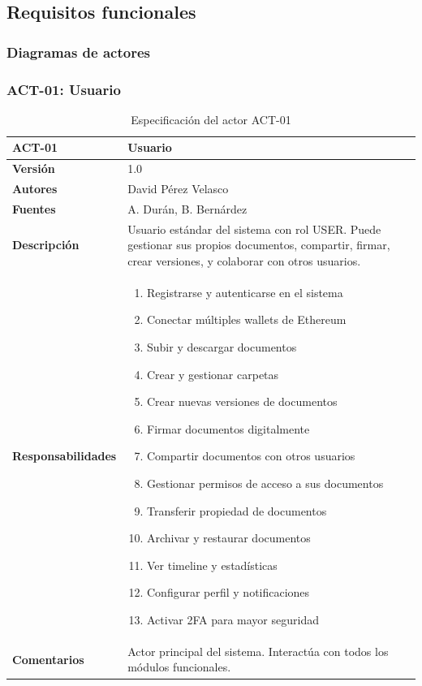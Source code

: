\documentclass[11pt, a4paper]{article}
\begin{document}
\subsection{Requisitos funcionales}

\subsubsection{Diagramas de actores}

\subsubsection{ACT-01: Usuario}

\begin{table}[H]
    \centering
    \small
    \begin{tabular}{|p{4cm}|p{10cm}|}
    \hline
    \textbf{ACT-01} & Usuario \\
    \hline
    \textbf{Versión} & 1.0 \\
    \hline
    \textbf{Autores} & David Pérez Velasco \\
    \hline
    \textbf{Fuentes} & A. Durán, B. Bernárdez \\
    \hline
    \textbf{Descripción} & Usuario estándar del sistema con rol USER. Puede gestionar sus propios documentos, compartir, firmar, crear versiones, y colaborar con otros usuarios. \\
    \hline
    \textbf{Responsabilidades} & 
    \begin{enumerate}
        \item Registrarse y autenticarse en el sistema
        \item Conectar múltiples wallets de Ethereum
        \item Subir y descargar documentos
        \item Crear y gestionar carpetas
        \item Crear nuevas versiones de documentos
        \item Firmar documentos digitalmente
        \item Compartir documentos con otros usuarios
        \item Gestionar permisos de acceso a sus documentos
        \item Transferir propiedad de documentos
        \item Archivar y restaurar documentos
        \item Ver timeline y estadísticas
        \item Configurar perfil y notificaciones
        \item Activar 2FA para mayor seguridad
    \end{enumerate} \\
    \hline
    \textbf{Comentarios} & Actor principal del sistema. Interactúa con todos los módulos funcionales. \\
    \hline
    \end{tabular}
    \caption{Especificación del actor ACT-01}
\end{table}
\end{document}
